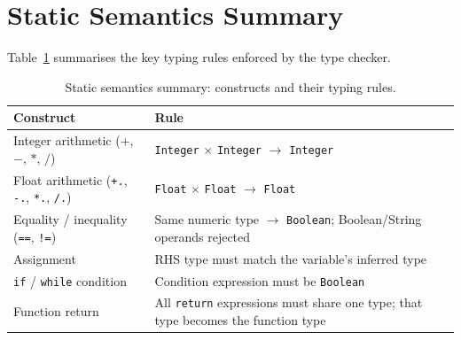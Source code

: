 \section{Static Semantics Summary}

Table~\ref{tab:static-semantics} summarises the key typing rules enforced by
the type checker.

\begin{table}[H]
\centering
\caption{Static semantics summary: constructs and their typing rules.\label{tab:static-semantics}}
\small
\begin{tabular}{p{5.5cm}p{7.5cm}}
\toprule
Construct & Rule \\
\midrule
Integer arithmetic ($+$, $-$, $*$, $/$) &
  \texttt{Integer} $\times$ \texttt{Integer} $\rightarrow$ \texttt{Integer} \\
Float arithmetic (\texttt{+.}, \texttt{-.}, \texttt{*.}, \texttt{/.}) &
  \texttt{Float} $\times$ \texttt{Float} $\rightarrow$ \texttt{Float} \\
Equality / inequality (\texttt{==}, \texttt{!=}) &
  Same numeric type $\rightarrow$ \texttt{Boolean}; Boolean/String operands rejected \\
Assignment &
  RHS type must match the variable's inferred type \\
\texttt{if} / \texttt{while} condition &
  Condition expression must be \texttt{Boolean} \\
Function return &
  All \texttt{return} expressions must share one type; that type becomes the function type \\
\bottomrule
\end{tabular}
\end{table}
